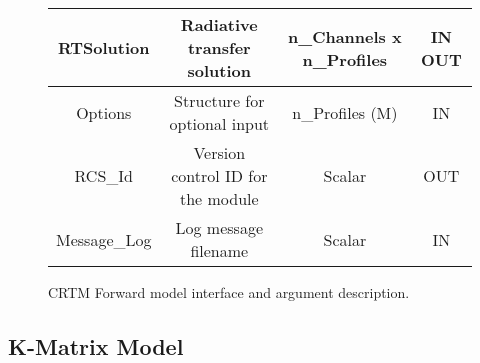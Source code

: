 \begin{figure}[htp]
{\begin{minipage}[b]{6.5in}
\begin{tabular}{c|c|c|c}
      \hline
      RTSolution         & Radiative transfer solution            & n\_Channels x n\_Profiles                 & IN OUT  \\
      \hline
      Options            & Structure for optional input           & n\_Profiles (M)  & IN      \\
      \hline
      RCS\_Id            & Version control ID for the module      & Scalar           & OUT     \\
      \hline
      Message\_Log       & Log message filename                   & Scalar           & IN      \\
    \end{tabular}
  \end{minipage}
  }
  \caption{CRTM Forward model interface and argument description.}
  \label{fig:fwd_interface}
\end{figure}


\subsection{K-Matrix Model}

